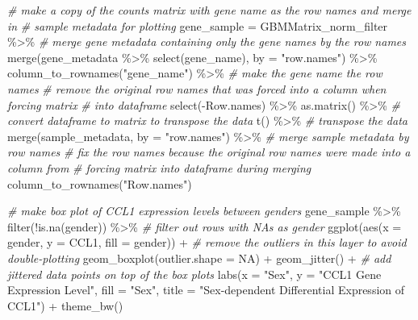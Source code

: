 \documentclass[
]{article}
\newenvironment{Shaded}{\begin{snugshade}}{\end{snugshade}}
\newcommand{\AttributeTok}[1]{\textcolor[rgb]{0.77,0.63,0.00}{#1}}
\newcommand{\CommentTok}[1]{\textcolor[rgb]{0.56,0.35,0.01}{\textit{#1}}}
\newcommand{\ConstantTok}[1]{\textcolor[rgb]{0.00,0.00,0.00}{#1}}
\newcommand{\FunctionTok}[1]{\textcolor[rgb]{0.00,0.00,0.00}{#1}}
\newcommand{\NormalTok}[1]{#1}
\newcommand{\OtherTok}[1]{\textcolor[rgb]{0.56,0.35,0.01}{#1}}
\newcommand{\SpecialCharTok}[1]{\textcolor[rgb]{0.00,0.00,0.00}{#1}}
\newcommand{\StringTok}[1]{\textcolor[rgb]{0.31,0.60,0.02}{#1}}
\begin{document}
\begin{Shaded}
\begin{Highlighting}[]
\CommentTok{\# make a copy of the counts matrix with gene name as the row names and merge in }
\CommentTok{\# sample metadata for plotting}
\NormalTok{gene\_sample }\OtherTok{=}\NormalTok{ GBMMatrix\_norm\_filter }\SpecialCharTok{\%\textgreater{}\%} 
  \CommentTok{\# merge gene metadata containing only the gene names by the row names}
  \FunctionTok{merge}\NormalTok{(gene\_metadata }\SpecialCharTok{\%\textgreater{}\%} \FunctionTok{select}\NormalTok{(gene\_name), }\AttributeTok{by =} \StringTok{"row.names"}\NormalTok{) }\SpecialCharTok{\%\textgreater{}\%} 
  \FunctionTok{column\_to\_rownames}\NormalTok{(}\StringTok{"gene\_name"}\NormalTok{) }\SpecialCharTok{\%\textgreater{}\%} \CommentTok{\# make the gene name the row names}
  \CommentTok{\# remove the original row names that was forced into a column when forcing matrix }
  \CommentTok{\# into dataframe}
  \FunctionTok{select}\NormalTok{(}\SpecialCharTok{{-}}\NormalTok{Row.names) }\SpecialCharTok{\%\textgreater{}\%} 
  \FunctionTok{as.matrix}\NormalTok{() }\SpecialCharTok{\%\textgreater{}\%} \CommentTok{\# convert dataframe to matrix to transpose the data}
  \FunctionTok{t}\NormalTok{() }\SpecialCharTok{\%\textgreater{}\%} \CommentTok{\# transpose the data}
  \FunctionTok{merge}\NormalTok{(sample\_metadata, }\AttributeTok{by =} \StringTok{"row.names"}\NormalTok{) }\SpecialCharTok{\%\textgreater{}\%} \CommentTok{\# merge sample metadata by row names}
  \CommentTok{\# fix the row names because the original row names were made into a column from }
  \CommentTok{\# forcing matrix into dataframe during merging}
  \FunctionTok{column\_to\_rownames}\NormalTok{(}\StringTok{"Row.names"}\NormalTok{) }

\CommentTok{\# make box plot of CCL1 expression levels between genders}
\NormalTok{gene\_sample }\SpecialCharTok{\%\textgreater{}\%} 
  \FunctionTok{filter}\NormalTok{(}\SpecialCharTok{!}\FunctionTok{is.na}\NormalTok{(gender)) }\SpecialCharTok{\%\textgreater{}\%} \CommentTok{\# filter out rows with NAs as gender}
  \FunctionTok{ggplot}\NormalTok{(}\FunctionTok{aes}\NormalTok{(}\AttributeTok{x =}\NormalTok{ gender, }\AttributeTok{y =}\NormalTok{ CCL1, }\AttributeTok{fill =}\NormalTok{ gender)) }\SpecialCharTok{+}
  \CommentTok{\# remove the outliers in this layer to avoid double{-}plotting}
  \FunctionTok{geom\_boxplot}\NormalTok{(}\AttributeTok{outlier.shape =} \ConstantTok{NA}\NormalTok{) }\SpecialCharTok{+} 
  \FunctionTok{geom\_jitter}\NormalTok{() }\SpecialCharTok{+} \CommentTok{\# add jittered data points on top of the box plots}
  \FunctionTok{labs}\NormalTok{(}\AttributeTok{x =} \StringTok{"Sex"}\NormalTok{, }\AttributeTok{y =} \StringTok{"CCL1 Gene Expression Level"}\NormalTok{, }\AttributeTok{fill =} \StringTok{"Sex"}\NormalTok{,}
       \AttributeTok{title =} \StringTok{"Sex{-}dependent Differential Expression of CCL1"}\NormalTok{) }\SpecialCharTok{+}
  \FunctionTok{theme\_bw}\NormalTok{()}
\end{Highlighting}
\end{Shaded}
\end{document}
